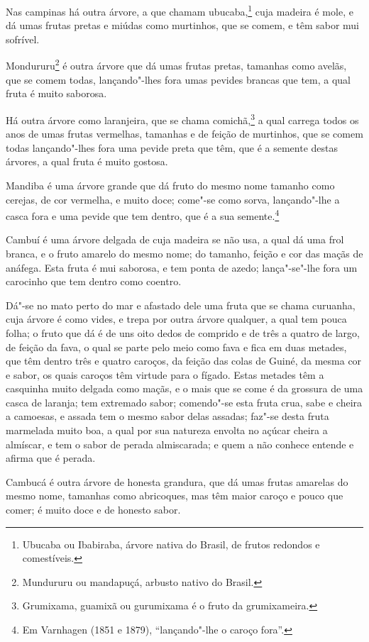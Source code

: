 Nas campinas há outra árvore, a que chamam ubucaba,\footnote{ Ubucaba ou Ibabiraba, árvore
nativa do Brasil, de frutos redondos e comestíveis.} cuja madeira é mole, e dá umas frutas
pretas e miúdas como murtinhos, que se comem, e têm sabor mui sofrível.

Mondururu\footnote{ Mundururu ou mandapuçá, arbusto nativo do Brasil.} é outra árvore que
dá umas frutas pretas, tamanhas como avelãs, que se comem todas, lançando"-lhes fora umas
pevides brancas que tem, a qual fruta é muito saborosa.

Há outra árvore como laranjeira, que se chama comichã,\footnote{ Grumixama, guamixã ou
gurumixama é o fruto da grumixameira.} a qual carrega todos os anos de umas frutas
vermelhas, tamanhas e de feição de murtinhos, que se comem todas lançando"-lhes fora uma
pevide preta que têm, que é a semente destas árvores, a qual fruta é muito gostosa.

Mandiba é uma árvore grande que dá fruto do mesmo nome tamanho como cerejas, de cor
vermelha, e muito doce; come"-se como sorva, lançando"-lhe a casca fora e uma pevide que tem
dentro, que é a sua semente.\footnote{ Em Varnhagen (1851 e 1879), ``lançando"-lhe o caroço
fora''.}

Cambuí é uma árvore delgada de cuja madeira se não usa, a qual dá uma frol branca, e o
fruto amarelo do mesmo nome; do tamanho, feição e cor das maçãs de anáfega. Esta fruta é
mui saborosa, e tem ponta de azedo; lança"-se"-lhe fora um carocinho que tem dentro como
coentro.

Dá"-se no mato perto do mar e afastado dele uma fruta que se chama curuanha, cuja árvore é
como vides, e trepa por outra árvore qualquer, a qual tem pouca folha; o fruto que dá é de
uns oito dedos de comprido e de três a quatro de largo, de feição da fava, o qual se parte
pelo meio como fava e fica em duas metades, que têm dentro três e quatro caroços, da
feição das colas de Guiné, da mesma cor e sabor, os quais caroços têm virtude para o
fígado. Estas metades têm a casquinha muito delgada como maçãs, e o mais que se come é da
grossura de uma casca de laranja; tem extremado sabor; comendo"-se esta fruta crua, sabe e
cheira a camoesas, e assada tem o mesmo sabor delas assadas; faz"-se desta fruta marmelada
muito boa, a qual por sua natureza envolta no açúcar cheira a almíscar, e tem o sabor de
perada almiscarada; e quem a não conhece entende e afirma que é perada.

Cambucá é outra árvore de honesta grandura, que dá umas frutas amarelas do mesmo nome,
tamanhas como abricoques, mas têm maior caroço e pouco que comer; é muito doce e de
honesto sabor.

